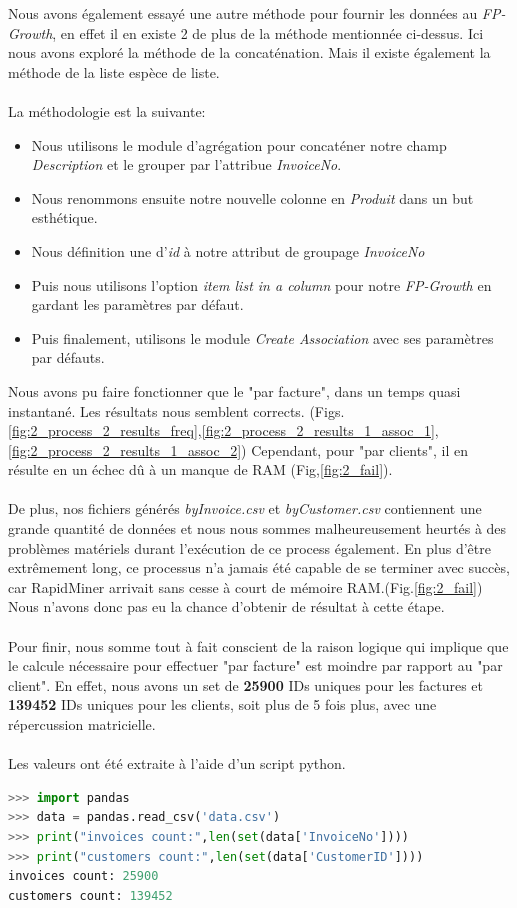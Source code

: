 \documentclass[a4paper]{article}
\begin{document}
Nous avons également essayé une autre méthode pour fournir les données au \textit{FP-Growth}, en effet il en existe 2 de plus de la méthode mentionnée ci-dessus. Ici nous avons exploré la méthode de la concaténation. Mais il existe également la méthode de la liste espèce de liste.
\\\\
La méthodologie est la suivante:
\begin{itemize}
	\item Nous utilisons le module d'agrégation pour concaténer notre champ \textit{Description} et le grouper par l'attribue \textit{InvoiceNo}.
	\item Nous renommons ensuite notre nouvelle colonne en \textit{Produit} dans un but esthétique.
	\item Nous définition une d'\textit{id} à notre attribut de groupage \textit{InvoiceNo}
	\item Puis nous utilisons l'option \textit{item list in a column} pour notre \textit{FP-Growth} en gardant les paramètres par défaut.
	\item Puis finalement, utilisons le module \textit{Create Association} avec ses paramètres par défauts.
\end{itemize}

\vspace{6pt}

Nous avons pu faire fonctionner que le "par facture", dans un temps quasi instantané. Les résultats nous semblent corrects. (Figs.\ref{fig:2_process_2_results_freq},\ref{fig:2_process_2_results_1_assoc_1},\ref{fig:2_process_2_results_1_assoc_2}) Cependant, pour "par clients", il en résulte en un échec dû à un manque de RAM (Fig,\ref{fig:2_fail}). 
\\\\
De plus, nos fichiers générés \textit{byInvoice.csv} et \textit{byCustomer.csv} contiennent une grande quantité de données et nous nous sommes malheureusement heurtés à des problèmes matériels durant l'exécution de ce process également. En plus d'être extrêmement long, ce processus n'a jamais été capable de se terminer avec succès, car RapidMiner arrivait sans cesse à court de mémoire RAM.(Fig.\ref{fig:2_fail})
\\
Nous n'avons donc pas eu la chance d'obtenir de résultat à cette étape.
\\\\
Pour finir, nous somme tout à fait conscient de la raison logique qui implique que le calcule nécessaire pour effectuer "par facture" est moindre par rapport au "par client". En effet, nous avons un set de \textbf{25900} IDs uniques pour les factures et \textbf{139452} IDs uniques pour les clients, soit plus de 5 fois plus, avec une répercussion matricielle.
\\\\
Les valeurs ont été extraite à l'aide d'un script python.
\begin{lstlisting}[language=python]
>>> import pandas
>>> data = pandas.read_csv('data.csv')
>>> print("invoices count:",len(set(data['InvoiceNo'])))
>>> print("customers count:",len(set(data['CustomerID'])))
invoices count: 25900
customers count: 139452
\end{lstlisting}
\end{document}
